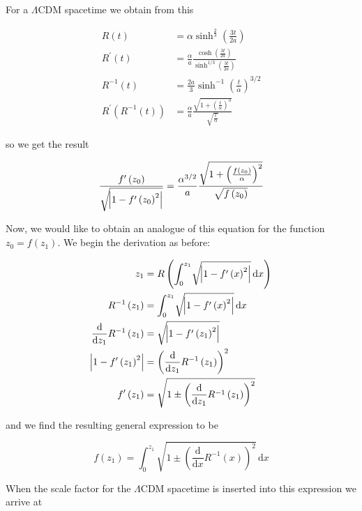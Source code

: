 \documentclass[preprint,notitlepage,amsmath,amssymb,floatfix]{revtex4-1}
\begin{document}
\noindent For a $\Lambda$CDM spacetime we obtain from this

\begin{align}
R\left(t\right) &= \alpha\sinh^\frac{2}{3}\left(\frac{3t}{2a}\right) \\
R^\prime\left(t\right) &= \frac{\alpha}{a}\frac{\cosh\left(\frac{3t}{2a}\right)}{\sinh^{1/3}\left(\frac{3t}{2a}\right)} \\
R^{-1}\left(t\right) &= \frac{2a}{3}\sinh^{-1}\left(\frac{t}{\alpha}\right)^{3/2} \\
R^\prime\left(R^{-1}\left(t\right)\right) &= \frac{\alpha}{a}\frac{\sqrt{1+\left(\frac{t}{\alpha}\right)^3}}{\sqrt{\frac{t}{\alpha}}}
\end{align}

\noindent so we get the result

\begin{equation}
\frac{f^\prime\left(z_0\right)}{\sqrt{\abs{1-f^\prime\left(z_0\right)^2}}} = \frac{\alpha^{3/2}}{a}\frac{\sqrt{1+\left(\frac{f\left(z_0\right)}{\alpha}\right)^2}}{\sqrt{f\left(z_0\right)}}
\end{equation}

Now, we would like to obtain an analogue of this equation for the function $z_0 = f\left(z_1\right)$.  We begin the derivation as before:

\begin{align}
z_1 &= R\left(\int_0^{z_1}\!\sqrt{\abs{1-f^\prime\left(x\right)^2}}\,\mathrm dx\right) \\
R^{-1}\left(z_1\right) &= \int_0^{z_1}\!\sqrt{\abs{1-f^\prime\left(x\right)^2}}\,\mathrm dx \\
\frac{\mathrm d}{\mathrm dz_1}R^{-1}\left(z_1\right) &= \sqrt{\abs{1-f^\prime\left(z_1\right)^2}} \\
\abs{1-f^\prime\left(z_1\right)^2} &= \left(\frac{\mathrm d}{\mathrm dz_1}R^{-1}\left(z_1\right)\right)^2 \\
f^\prime\left(z_1\right) &= \sqrt{1\pm\left(\frac{\mathrm d}{\mathrm dz_1}R^{-1}\left(z_1\right)\right)^2}
\end{align}

\noindent and we find the resulting general expression to be

\begin{equation}
f\left(z_1\right) = \int_0^{z_1}\!\sqrt{1\pm\left(\frac{\mathrm d}{\mathrm dx}R^{-1}\left(x\right)\right)^2}\,\mathrm dx
\end{equation}

\noindent When the scale factor for the $\Lambda$CDM spacetime is inserted into this expression we arrive at
\end{document}
